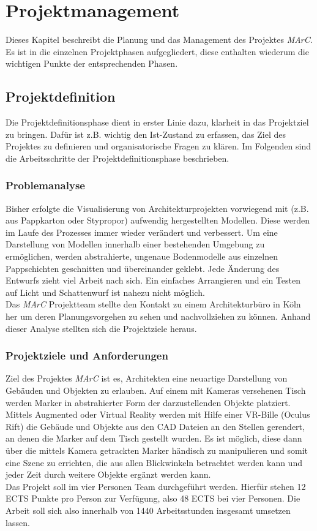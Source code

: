 \section{Projektmanagement} \label{sec:pm}

Dieses Kapitel beschreibt die Planung und das Management des Projektes \textit{MArC}. Es ist in die einzelnen Projektphasen aufgegliedert, diese enthalten wiederum die wichtigen Punkte der entsprechenden Phasen.

\subsection{Projektdefinition}
Die Projektdefinitionsphase dient in erster Linie dazu, klarheit in das Projektziel zu bringen. Dafür ist z.B. wichtig den Ist-Zustand zu erfassen, das Ziel des Projektes zu definieren und organisatorische Fragen zu klären. Im Folgenden sind die Arbeitsschritte der Projektdefinitionsphase beschrieben.
\subsubsection{Problemanalyse}
\label{sec:problemanalye}
Bisher erfolgte die Visualisierung von Architekturprojekten vorwiegend mit (z.B. aus Pappkarton oder Stypropor) aufwendig hergestellten Modellen. Diese werden im Laufe des Prozesses immer wieder verändert und verbessert.
Um eine Darstellung von Modellen innerhalb einer bestehenden Umgebung zu ermöglichen, werden abstrahierte, ungenaue Bodenmodelle aus einzelnen Pappschichten geschnitten und übereinander geklebt. Jede Änderung des Entwurfs zieht viel Arbeit nach sich. Ein einfaches Arrangieren und ein Testen auf Licht und Schattenwurf ist nahezu nicht möglich.\\
Das \textit{MArC} Projektteam stellte den Kontakt zu einem Architekturbüro in Köln her um deren Planungsvorgehen zu sehen und nachvollziehen zu können. Anhand dieser Analyse stellten sich die Projektziele heraus.


\subsubsection{Projektziele und Anforderungen}
Ziel des Projektes \textit{MArC} ist es, Architekten eine neuartige Darstellung von Gebäuden und Objekten zu erlauben. Auf einem mit Kameras versehenen Tisch werden Marker in abstrahierter Form der darzustellenden Objekte platziert. Mittels Augmented oder Virtual Reality werden mit Hilfe einer VR-Bille (Oculus Rift) die Gebäude und Objekte aus den CAD Dateien an den Stellen gerendert, an denen die Marker auf dem Tisch gestellt wurden.
Es ist möglich, diese dann über die mittels Kamera getrackten Marker händisch zu manipulieren und somit eine Szene zu errichten, die aus allen Blickwinkeln betrachtet werden kann und jeder Zeit durch weitere Objekte ergänzt werden kann. \\
Das Projekt soll im vier Personen Team durchgeführt werden. Hierfür stehen 12 ECTS Punkte pro Person zur Verfügung, also 48 ECTS bei vier Personen. Die Arbeit soll sich also innerhalb von 1440 Arbeitsstunden insgesamt umsetzen lassen.


